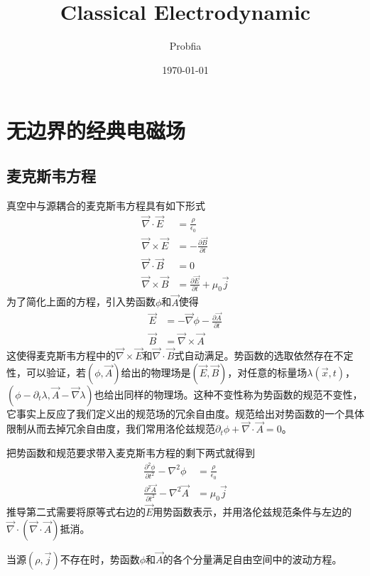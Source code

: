 \documentclass[a4paper,11pt]{ctexart}
\title{Classical Electrodynamic}
\author{Probfia}
\date{\today}
\newcommand{\bea}{\begin{equation}\begin{aligned}}
\newcommand{\eea}{\end{aligned}\end{equation}}
\newcommand{\del}{\vec{\nabla}}
\newcommand{\epv}{\epsilon_0}
\newcommand{\pfrac}[2]{\frac{\partial #1}{\partial #2}}
\begin{document}
\maketitle
\tableofcontents



\section{无边界的经典电磁场}
\subsection{麦克斯韦方程}
真空中与源耦合的麦克斯韦方程具有如下形式
\bea \label{maxeq}
\del \cdot \vec{E} &= \frac{\rho}{\epv} \\
\del \times \vec{E} &= -\pfrac{\vec{B}}{t} \\
\del \cdot \vec{B} &= 0 \\ 
\del \times \vec{B} &= \pfrac{\vec{E}}{t}+ \mu_0 \vec{j}
\eea
为了简化上面的方程，引入势函数$\phi$和$\vec{A}$使得
\bea
\vec{E} &= -\del \phi - \pfrac{\vec{A}}{t} \\
\vec{B} & = \del \times \vec{A}
\eea
这使得麦克斯韦方程中的$\del \times \vec{E}$和$\del \cdot \vec{B}$式自动满足。势函数的选取依然存在不定性，可以验证，若$(\phi,\vec A)$给出的物理场是$( \vec E , \vec B )$，对任意的标量场$\lambda (\vec{x},t)$，$(\phi -\partial_t \lambda, \vec A - \del \lambda )$也给出同样的物理场。这种不变性称为势函数的规范不变性，它事实上反应了我们定义出的规范场的冗余自由度。规范给出对势函数的一个具体限制从而去掉冗余自由度，我们常用洛伦兹规范$\partial_t \phi + \del \cdot \vec A = 0$。
\par
把势函数和规范要求带入麦克斯韦方程的剩下两式就得到
\bea \label{maxpot}
\frac{\partial^2 \phi}{\partial t^2} - \nabla^2 \phi &= \frac{\rho }{\epv} \\
\frac{\partial^2 \vec A}{\partial t^2} - \nabla^2 \vec A &= \mu_0 \vec j 
\eea
推导第二式需要将原等式右边的$\vec E$用势函数表示，并用洛伦兹规范条件与左边的$\del \cdot ( \del \cdot \vec A)$抵消。
\par
当源$(\rho, \vec j )$不存在时，势函数$\phi$和$\vec A$的各个分量满足自由空间中的波动方程。
\end{document}
